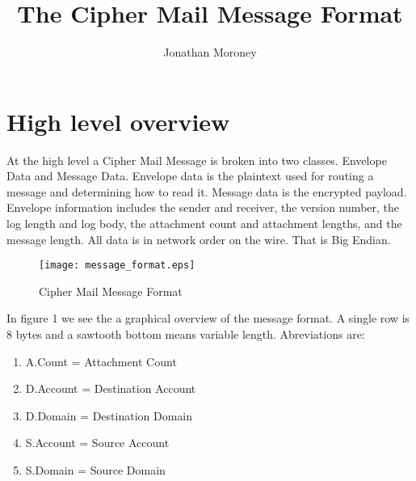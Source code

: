 \documentclass[a4paper,11pt]{IEEEtran}
\title{The Cipher Mail Message Format}
\author{Jonathan Moroney}
\begin{document}
\maketitle
\tableofcontents


\section{High level overview}
At the high level a Cipher Mail Message is broken into two classes. Envelope Data and Message Data. Envelope data is the plaintext used for routing a message and determining how to read it. Message data is the encrypted payload. Envelope information includes the sender and receiver, the version number, the log length and log body, the attachment count and attachment lengths, and the message length. All data is in network order on the wire. That is Big Endian.
\begin{figure}[H]
\centering
\texttt{[image: message\_format.eps]}
\caption{Cipher Mail Message Format}
\end{figure}
In figure 1 we see the a graphical overview of the message format. A single row is 8 bytes and a sawtooth bottom means variable length. Abreviations are:
\begin{enumerate}
  \item A.Count = Attachment Count
  \item D.Account = Destination Account
  \item D.Domain = Destination Domain
  \item S.Account = Source Account
  \item S.Domain = Source Domain
\end{enumerate}
\end{document}
